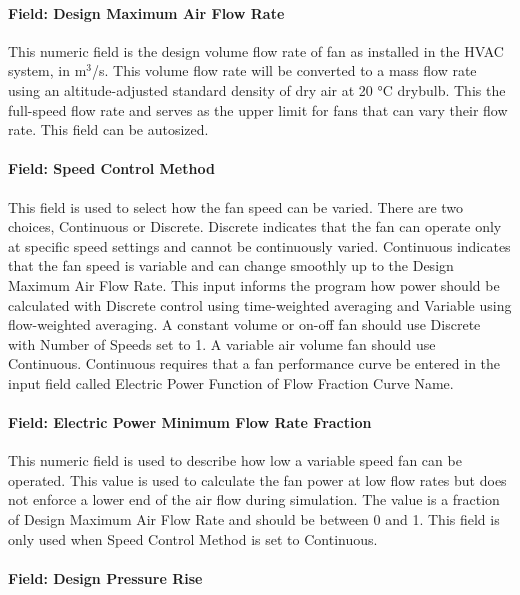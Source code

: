 \paragraph{Field: Design Maximum Air Flow Rate}\label{field-design-air-flow-fansysmodel}

This numeric field is the design volume flow rate of fan as installed in the HVAC system, in m\(^{3}\)/s. This volume flow rate will be converted to a mass flow rate using an altitude-adjusted standard density of dry air at 20 °C drybulb. This the full-speed flow rate and serves as the upper limit for fans that can vary their flow rate. This field can be autosized. 

\paragraph{Field: Speed Control Method}\label{field-speed-method-fansysmodel}

This field is used to select how the fan speed can be varied. There are two choices, Continuous or Discrete.  Discrete indicates that the fan can operate only at specific speed settings and cannot be continuously varied.  Continuous indicates that the fan speed is variable and can change smoothly up to the Design Maximum Air Flow Rate.  This input informs the program how power should be calculated with Discrete control using time-weighted averaging and Variable using flow-weighted averaging. A constant volume or on-off fan should use Discrete with Number of Speeds set to 1.  A variable air volume fan should use Continuous. Continuous requires that a fan performance curve be entered in the input field called Electric Power Function of Flow Fraction Curve Name.

\paragraph{Field: Electric Power Minimum Flow Rate Fraction}\label{field-power-min-flow-fraction-fansysmodel}

This numeric field is used to describe how low a variable speed fan can be operated. This value is used to calculate the fan power at low flow rates but does not enforce a lower end of the air flow during simulation. The value is a fraction of Design Maximum Air Flow Rate and should be between 0 and 1.  This field is only used when Speed Control Method is set to Continuous.  

\paragraph{Field: Design Pressure Rise}\label{field-pressure-fansysmodel}

